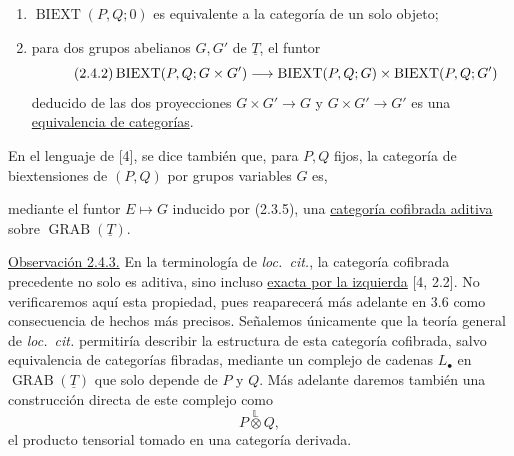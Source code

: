 \begin{enumerate}[label=\alph*)]
\item $\operatorname{BIEXT}(P,Q;0)$ es equivalente a la categoría de
un solo objeto;
\item para dos grupos abelianos $G,G'$ de $\underline T$, el funtor
\begin{equation}\tag{2.4.2}
 \sisi{\operatorname{BIEXT}(P,G;G\times G')}%
       {\operatorname{BIEXT}(P,Q;G\times G')}
 \longrightarrow
 \operatorname{BIEXT}(P,Q;G)\times
 \operatorname{BIEXT}(P,Q;G')
\end{equation}
deducido de las dos proyecciones $G\times G'\longrightarrow G$ y
$G\times G'\longrightarrow G'$ es una
\underline{equivalencia de categorías}.
\end{enumerate}
En el lenguaje de [4], se dice también que, para $P,Q$ fijos, la
categoría de biextensiones de $(P,Q)$ por grupos variables $G$ es,


mediante el funtor $E\mapsto G$ inducido por (2.3.5), una
\underline{categoría cofibrada aditiva} sobre
$\operatorname{GRAB}(\underline T)$.

\underline{Observación 2.4.3.} En la terminología de \emph{loc.\ cit.},
la categoría cofibrada precedente no solo es aditiva, sino incluso
\underline{exacta por la izquierda} [4, 2.2]. No verificaremos aquí
esta propiedad, pues reaparecerá más adelante en 3.6 como consecuencia
de hechos más precisos. Señalemos únicamente que la teoría general de
\emph{loc.\ cit.} permitiría describir la estructura de esta categoría
cofibrada, salvo equivalencia de categorías fibradas, mediante un
complejo de cadenas $L_\bullet$ en
$\operatorname{GRAB}(\underline T)$ que solo depende de $P$ y $Q$.
Más adelante daremos también una construcción directa de este complejo
como
\[
 P\overset{\mathbb L}{\otimes}Q,
\]
el producto tensorial tomado en una categoría derivada.
